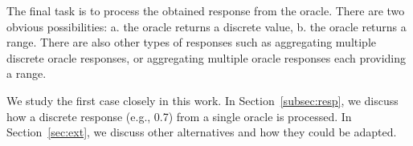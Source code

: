  The final task is to process the obtained response from the oracle. There are two obvious possibilities: a. the oracle returns a discrete value, b. the oracle returns a range. There are also other types of responses such as aggregating multiple discrete oracle responses, or aggregating multiple oracle responses each providing a range. 

We study the first case closely in this work. In Section~\ref{subsec:resp}, we discuss how a discrete response (e.g., 0.7) from a single oracle is processed. In Section~\ref{sec:ext}, we discuss other alternatives and how they could be adapted.





